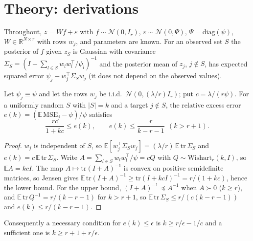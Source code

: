 \section{Theory: derivations}
\label{app:theory}
Throughout, $z=Wf+\varepsilon$ with $f\sim\mathcal N(0,I_r)$, $\varepsilon\sim\mathcal N(0,\Psi)$, $\Psi=\mathrm{diag}(\psi)$, $W\in\mathbb R^{N\times r}$ with rows $w_j$, and parameters are known. For an observed set $S$ the posterior of $f$ given $z_S$ is Gaussian with covariance $\Sigma_S=(I+\sum_{l\in S}w_lw_l^\top/\psi_l)^{-1}$ and the posterior mean of $z_j$, $j\notin S$, has expected squared error $\psi_j+w_j^\top\Sigma_Sw_j$ (it does not depend on the observed values).

\begin{proposition}\label{prop:bound}
Let $\psi_j\equiv\psi$ and let the rows $w_j$ be i.i.d.\ $\mathcal N(0,(\lambda/r)I_r)$; put $c=\lambda/(r\psi)$. For a uniformly random $S$ with $|S|=k$ and a target $j\notin S$, the relative excess error $e(k)=(\mathbb E\,\mathrm{MSE}_j-\psi)/\psi$ satisfies
\[
\frac{rc}{1+kc}\le e(k),\qquad e(k)\le \frac{r}{k-r-1}\ \ (k>r+1).
\]
\end{proposition}
\begin{proof}
$w_j$ is independent of $S$, so $\mathbb E[w_j^\top\Sigma_Sw_j]=(\lambda/r)\,\mathbb E\,\mathrm{tr}\,\Sigma_S$ and $e(k)=c\,\mathbb E\,\mathrm{tr}\,\Sigma_S$. Write $A=\sum_{l\in S}w_lw_l^\top/\psi=cQ$ with $Q\sim\mathrm{Wishart}_r(k,I)$, so $\mathbb EA=kcI$. The map $A\mapsto\mathrm{tr}(I+A)^{-1}$ is convex on positive semidefinite matrices, so Jensen gives $\mathbb E\,\mathrm{tr}(I+A)^{-1}\ge\mathrm{tr}(I+kcI)^{-1}=r/(1+kc)$, hence the lower bound. For the upper bound, $(I+A)^{-1}\preceq A^{-1}$ when $A\succ0$ ($k\ge r$), and $\mathbb E\,\mathrm{tr}\,Q^{-1}=r/(k-r-1)$ for $k>r+1$, so $\mathbb E\,\mathrm{tr}\,\Sigma_S\le r/(c(k-r-1))$ and $e(k)\le r/(k-r-1)$.
\end{proof}
Consequently a necessary condition for $e(k)\le\epsilon$ is $k\ge r/\epsilon-1/c$ and a sufficient one is $k\ge r+1+r/\epsilon$.

